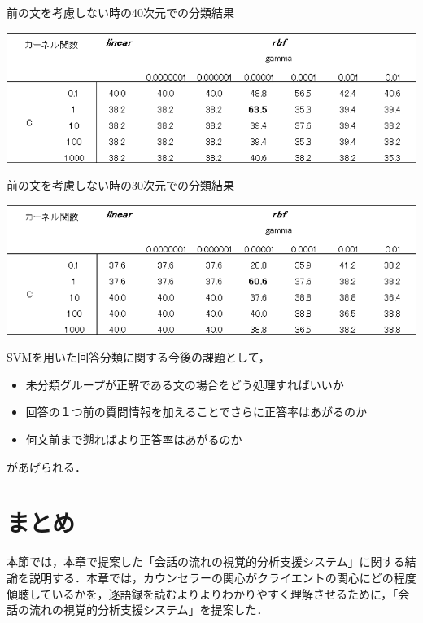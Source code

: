 \documentclass[shuuron]{kuee}
\begin{document}
\begin{table}
  \caption{前の文を考慮しない時の40次元での分類結果}
  \label{table:hayashida3}
  \begin{center}
    \includegraphics[width=\linewidth]{hayashida3.png}
  \end{center}
\end{table}

\begin{table}
  \caption{前の文を考慮しない時の30次元での分類結果}
  \label{table:hayashida4}
  \begin{center}
    \includegraphics[width=\linewidth]{hayashida4.png}
  \end{center}
\end{table}

SVMを用いた回答分類に関する今後の課題として，
\begin{itemize}
  \item 未分類グループが正解である文の場合をどう処理すればいいか
  \item 回答の１つ前の質問情報を加えることでさらに正答率はあがるのか
  \item   何文前まで遡ればより正答率はあがるのか
\end{itemize}
があげられる．


\section{まとめ}

本節では，本章で提案した「会話の流れの視覚的分析支援システム」に関する結論を説明する．本章では，カウンセラーの関心がクライエントの関心にどの程度傾聴しているかを，逐語録を読むよりよりわかりやすく理解させるために，「会話の流れの視覚的分析支援システム」を提案した．
\end{document}

